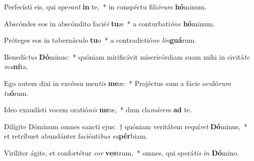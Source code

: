 \item Perfecísti eis, qui spe\textit{rant} \textbf{in} te,~* in conspéctu fili\textit{ó}\textit{rum} \textbf{hó}minum.
\item Abscóndes eos in abscóndito facié\textit{i} \textbf{tu}æ~* a conturbati\textit{ó}\textit{ne} \textbf{hó}minum.
\item Próteges eos in tabernácu\textit{lo} \textbf{tu}o~* a contradictió\textit{ne} \textit{lin}\textbf{guá}rum.
\item Benedíc\textit{tus} \textbf{Dó}minus:~* quóniam mirificávit misericórdiam suam mihi in civitá\textit{te} \textit{mu}\textbf{ní}ta.
\item Ego autem dixi in excéssu men\textit{tis} \textbf{me}æ:~* Projéctus sum a fácie oculó\textit{rum} \textit{tu}\textbf{ó}rum.
\item Ideo exaudísti vocem oratió\textit{nis} \textbf{me}æ,~* dum cla\textit{má}\textit{rem} \textbf{ad} te.
\item Dilígite Dóminum omnes sancti ejus:~† quóniam veritátem requí\textit{ret} \textbf{Dó}minus,~* et retríbuet abundánter faciénti\textit{bus} \textit{su}\textbf{pér}biam.
\item Viríliter ágite, et confortétur \textit{cor} \textbf{ves}trum,~* omnes, qui sperá\textit{tis} \textit{in} \textbf{Dó}mino.
